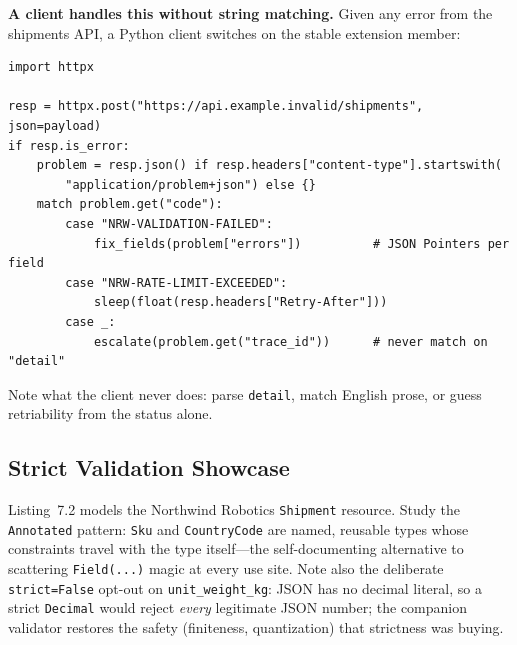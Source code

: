 \begin{examplebox}
\textbf{A client handles this without string matching.} Given any error from
the shipments API, a Python client switches on the stable extension member:
\begin{verbatim}
import httpx

resp = httpx.post("https://api.example.invalid/shipments", json=payload)
if resp.is_error:
    problem = resp.json() if resp.headers["content-type"].startswith(
        "application/problem+json") else {}
    match problem.get("code"):
        case "NRW-VALIDATION-FAILED":
            fix_fields(problem["errors"])          # JSON Pointers per field
        case "NRW-RATE-LIMIT-EXCEEDED":
            sleep(float(resp.headers["Retry-After"]))
        case _:
            escalate(problem.get("trace_id"))      # never match on "detail"
\end{verbatim}
Note what the client never does: parse \texttt{detail}, match English prose,
or guess retriability from the status alone.
\end{examplebox}

\subsection{Strict Validation Showcase}

Listing~7.2 models the Northwind Robotics \texttt{Shipment} resource. Study
the \texttt{Annotated} pattern: \texttt{Sku} and \texttt{CountryCode} are
named, reusable types whose constraints travel with the type itself---the
self-documenting alternative to scattering \texttt{Field(...)} magic at every
use site. Note also the deliberate \texttt{strict=False} opt-out on
\texttt{unit\_weight\_kg}: JSON has no decimal literal, so a strict
\texttt{Decimal} would reject \emph{every} legitimate JSON number; the
companion validator restores the safety (finiteness, quantization) that
strictness was buying.

